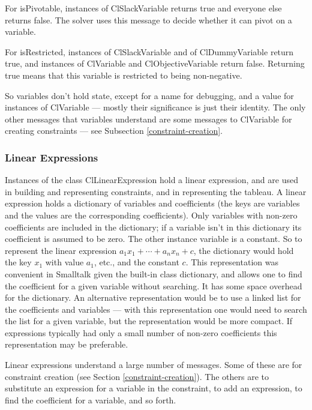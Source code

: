 \documentclass{article}
\begin{document}
For {\sf isPivotable}, instances of {\sf ClSlackVariable} returns true
and everyone else returns false.  The solver uses this message to decide
whether it can pivot on a variable.

For {\sf isRestricted}, instances of {\sf ClSlackVariable} and
of {\sf ClDummyVariable} return true, and instances of
{\sf ClVariable} and {\sf ClObjectiveVariable} return false.  Returning
true means that this variable is restricted to being non-negative.

So variables don't hold state, except for a name for debugging, and a value
for instances of {\sf ClVariable} --- mostly their significance is just
their identity.  The only other messages that variables understand are some
messages to {\sf ClVariable} for creating constraints --- see Subsection
\ref{constraint-creation}.

\subsubsection{Linear Expressions}

Instances of the class {\sf ClLinearExpression} hold a linear expression,
and are used in building and representing
constraints, and in representing the tableau.  A linear expression holds a
dictionary of variables and coefficients (the keys are variables and the
values are the corresponding coefficients).  Only variables
with non-zero coefficients are included in the dictionary; 
if a variable isn't in this
dictionary its coefficient is assumed to be zero.  The other instance
variable is a constant.  So to represent the linear expression 
$a_1 x_1 + \cdots + a_n x_n + c$, the dictionary would hold the key $x_1$
with value $a_1$, etc., and the constant $c$.  This representation was
convenient in Smalltalk given the built-in class dictionary, and allows one
to find the coefficient for a given variable without searching.  It has
some space overhead for the dictionary.  An alternative representation
would be to use a linked list for the coefficients and variables --- with
this representation one would need to search the list for a given variable,
but the representation would be more compact.  If expressions typically had
only a small number of non-zero coefficients this representation may be
preferable.

Linear expressions understand  a large number of messages.  Some of these
are for constraint creation (see Section \ref{constraint-creation}).  The
others are to substitute an expression for a variable in the constraint, to
add an expression, to find the coefficient for a variable, and so forth.
\end{document}
